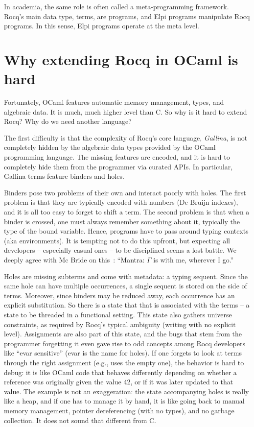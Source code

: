 \documentclass{these-ISSS}
\begin{document}
In academia, the same role is often called a meta-programming framework. Rocq's
main data type, terms, are programs, and Elpi programs manipulate Rocq
programs. In this sense, Elpi programs operate at the meta level.


\section{Why extending Rocq in OCaml is hard}

Fortunately, OCaml features automatic memory management, types, and algebraic
data. It is much, much higher level than C. So why is it hard to extend Rocq?
Why do we need another language?

The first difficulty is that the complexity of Rocq's core language,
\emph{Gallina}, is not completely hidden by the algebraic data types
provided by the OCaml
programming language. The missing features are encoded, and it is hard to
completely hide them from the programmer via curated APIs. In particular,
Gallina terms feature binders and holes.

Binders pose two problems of their own and interact poorly with holes. The
first problem is that they are typically encoded with numbers (De Bruijn
indexes), and it is all too easy to forget to shift a term. The second
problem is that when a binder is crossed, one must always remember something
about it, typically the type of the bound variable. Hence, programs have to
pass around typing contexts (aka environments). It is tempting not to do this
upfront, but expecting all developers -- especially casual ones -- to be disciplined
seems a lost battle. We deeply agree with Mc Bride on this~\cite[page 20]{mcbride}:
``Mantra: $\Gamma$ is with me, wherever I go.''

Holes are missing subterms and come with metadata: a typing sequent. Since the
same hole can have multiple occurrences, a single sequent is stored on the side of
terms. Moreover, since binders may be reduced away, each occurrence has an
explicit substitution. So there is a state that that is associated with the terms --
a state to be threaded in a functional setting. This state also gathers universe
constraints, as required by Rocq's typical ambiguity (writing  with
no explicit level).
Assignments are also part of this state, and the bugs that stem from the
programmer forgetting it even gave rise to odd concepts among Rocq developers
like ``evar sensitive'' (evar is the name for holes). If one forgets to look at
terms through the right assignment (e.g., uses the empty one), the behavior is
hard to debug: it is like OCaml code that behaves differently depending on
whether a reference  was originally given the value 42, or if it was
later updated to that value.
The example is not an exaggeration: the state accompanying holes is really like
a heap, and if one has to manage it by hand, it is like going back to manual
memory management, pointer dereferencing (with no types), and no garbage
collection. It does not sound that different from C.
\end{document}
